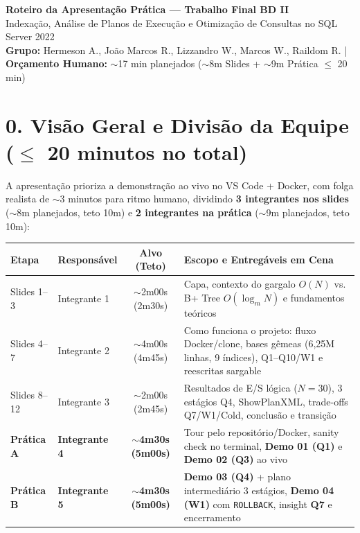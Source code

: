 \documentclass[10pt,a4paper]{article}
\begin{document}
\begin{tcolorbox}[colback=BrandDark,colframe=BrandDark,arc=4pt,left=11pt,right=11pt,top=8pt,bottom=8pt]
  {\Large\bfseries\color{white} Roteiro da Apresentação Prática — Trabalho Final BD II}\\[3pt]
  {\small\color{BrandLine} Indexação, Análise de Planos de Execução e Otimização de Consultas no SQL Server 2022}\\[4pt]
  {\footnotesize\color{white}
    \textbf{Grupo:} Hermeson A., João Marcos R., Lizzandro W., Marcos W., Raildom R. \quad|\quad
    \textbf{Orçamento Humano:} $\sim$17 min planejados ($\sim$8m Slides + $\sim$9m Prática $\le$ 20 min)
  }
\end{tcolorbox}

\section*{0. Visão Geral e Divisão da Equipe ($\le$ 20 minutos no total)}
A apresentação prioriza a demonstração ao vivo no VS Code + Docker, com folga realista de $\sim$3 minutos para ritmo humano, dividindo \textbf{3 integrantes nos slides} ($\sim$8m planejados, teto 10m) e \textbf{2 integrantes na prática} ($\sim$9m planejados, teto 10m):

\renewcommand{\arraystretch}{1.18}
\begin{center}
\small
\begin{tabularx}{\linewidth}{@{} l l c X @{}}
\toprule
\rowcolor{BrandBg}
\textbf{Etapa} & \textbf{Responsável} & \textbf{Alvo (Teto)} & \textbf{Escopo e Entregáveis em Cena} \\
\midrule
Slides 1--3 & Integrante 1 & $\sim$2m00s (2m30s) & Capa, contexto do gargalo $O(N)$ vs. B+ Tree $O(\log_m N)$ e fundamentos teóricos \\
Slides 4--7 & Integrante 2 & $\sim$4m00s (4m45s) & Como funciona o projeto: fluxo Docker/clone, bases gêmeas (6,25M linhas, 9 índices), Q1--Q10/W1 e reescritas sargable \\
Slides 8--12 & Integrante 3 & $\sim$2m00s (2m45s) & Resultados de E/S lógica ($N=30$), 3 estágios Q4, ShowPlanXML, trade-offs Q7/W1/Cold, conclusão e transição \\
\midrule
\rowcolor{InfoBg}
\textbf{Prática A} & \textbf{Integrante 4} & \textbf{$\sim$4m30s (5m00s)} & Tour pelo repositório/Docker, sanity check no terminal, \textbf{Demo 01 (Q1)} e \textbf{Demo 02 (Q3)} ao vivo \\
\rowcolor{InfoBg}
\textbf{Prática B} & \textbf{Integrante 5} & \textbf{$\sim$4m30s (5m00s)} & \textbf{Demo 03 (Q4)} + plano intermediário 3 estágios, \textbf{Demo 04 (W1)} com \texttt{ROLLBACK}, insight \textbf{Q7} e encerramento \\
\bottomrule
\end{tabularx}
\end{center}
\end{document}

